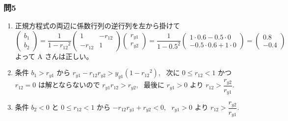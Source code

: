 \documentclass[./main.tex]{subfiles}
\begin{document}
    \subsubsection*{問5}

    \begin{enumerate}
        \item 正規方程式の両辺に係数行列の逆行列を左から掛けて
        \begin{equation*}
            \begin{pmatrix}
                b_1\\
                b_2
            \end{pmatrix}
            = \frac{1}{1 - {r_{12}}^2}
            \begin{pmatrix}
                1 & -r_{12}\\
                -r_{12} & 1
            \end{pmatrix}
            \begin{pmatrix}
                r_{y1}\\
                r_{y2}
            \end{pmatrix}
            = \frac{1}{1 - 0.5^2}
            \begin{pmatrix}
                1 \cdot 0.6 - 0.5 \cdot 0\\
                -0.5 \cdot 0.6 + 1 \cdot 0
            \end{pmatrix}
            =
            \begin{pmatrix}
                0.8\\
                -0.4
            \end{pmatrix}
        \end{equation*}
        よって A さんは正しい。

        \item 条件 $b_1 > r_{y1}$ から $r_{y1} - r_{12} r_{y2} > y_{y1} (1 - {r_{12}}^2)$, \ 
        次に $0 \leq r_{12} < 1$ かつ $r_{12} = 0$ は解とならないので $r_{y1} r_{12} > r_{y2}$, \
        最後に $r_{y1} > 0$ より $r_{12} > \dfrac{r_{y2}}{r_{y1}}$.

        \item 条件 $b_2 < 0$ と $0 \leq r_{12} < 1$ から $-r_{12} r_{y1} + r_{y2} < 0$, \
        $r_{y1} > 0$ より $r_{12} > \dfrac{r_{y2}}{r_{y1}}$.


\end{enumerate}
\end{document}
